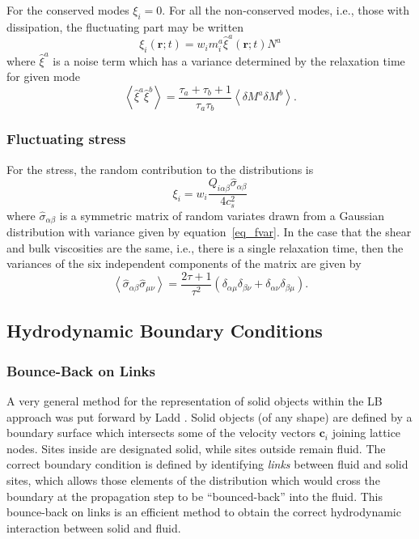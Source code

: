 For the conserved modes $\xi_i = 0$. For all the non-conserved modes,
i.e., those with dissipation, the fluctuating part may be written
\begin{equation}
\xi_i (\mathbf{r}; t) = w_i m_i^a \hat{\xi}^a (\mathbf{r}; t) N^a
\end{equation}
where $\hat{\xi}^a$ is a noise term which has a variance determined
by the relaxation time for given mode
\begin{equation}
\left< \hat{\xi}^a \hat{\xi}^b \right> =
\frac{\tau_a + \tau_b + 1}{\tau_a \tau_b}
\left< \delta M^a \delta M^b \right>.
\label{eq_fvar}
\end{equation}

\subsubsection{Fluctuating stress}

For the stress, the random contribution to the distributions is
\begin{equation}
\xi_i = w_i \frac{Q_{i\alpha\beta} \hat{\sigma}_{\alpha\beta}}{4c_s^2}
\end{equation}
where $\hat{\sigma}_{\alpha\beta}$ is a symmetric matrix of random
variates drawn from a Gaussian distribution with variance given
by equation~\ref{eq_fvar}. In the case that the shear and bulk
viscosities are the same, i.e., there is a single relaxation
time, then the variances of the six independent components of
the matrix are given by
\begin{equation}
\left< \hat{\sigma}_{\alpha\beta} \hat{\sigma}_{\mu\nu} \right> =
\frac{2\tau + 1}{\tau^2}
(\delta_{\alpha\mu}\delta_{\beta\nu} + \delta_{\alpha\nu} \delta_{\beta\mu}).
\end{equation}


\subsection{Hydrodynamic Boundary Conditions}

\subsubsection{Bounce-Back on Links}

A very general method for the representation of solid objects
within the LB approach was put forward by Ladd \cite{l94a, l94b}.
Solid objects (of any shape) are defined by a boundary surface
which intersects some of the velocity vectors $\mathbf{c}_i$
joining lattice nodes. Sites inside are designated solid, while
sites outside remain fluid. The correct boundary condition is
defined by identifying \textit{links} between fluid and solid
sites, which allows those elements of the distribution which would
cross the boundary at the propagation step to be ``bounced-back''
into the fluid. This bounce-back on links is an efficient method
to obtain the  correct hydrodynamic interaction between solid
and fluid.


